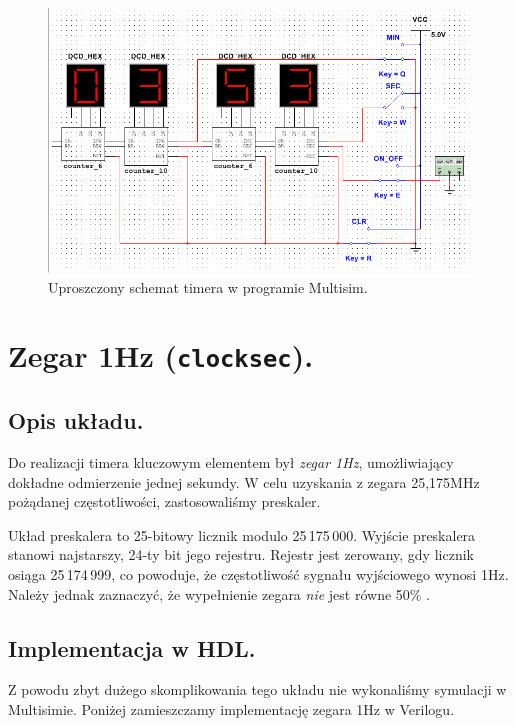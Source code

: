 \documentclass[a4paper,oneside]{report}
\newcommand{\clocksec}{\texttt{clock\textunderscore sec}}
\begin{document}


\begin{figure}[h]
\centering
\includegraphics[width=\textwidth]{timer.png}
\caption[Uproszczony schemat timera.]{Uproszczony schemat timera w programie Multisim.}
\label{timer_scheme}
\end{figure}

\section{Zegar 1Hz (\clocksec).}
\subsection{Opis układu.}
Do realizacji timera kluczowym elementem był \emph{zegar 1Hz},
umożliwiający dokładne odmierzenie jednej sekundy. 
W celu uzyskania z zegara 25,175MHz pożądanej częstotliwości, 
zastosowaliśmy preskaler.

Układ preskalera to 25-bitowy licznik modulo 25\,175\,000. 
Wyjście preskalera stanowi najstarszy, 24-ty bit jego rejestru. 
Rejestr jest zerowany, gdy licznik osiąga 25\,174\,999, co powoduje, że
częstotliwość sygnału wyjściowego wynosi 1Hz. Należy jednak
zaznaczyć, że wypełnienie zegara \emph{nie} jest równe 50\% .

\subsection{Implementacja w HDL.}
Z powodu zbyt dużego skomplikowania tego układu nie wykonaliśmy
symulacji w Multisimie. Poniżej zamieszczamy implementację zegara
1Hz w Verilogu.

\pagebreak

\end{document}
